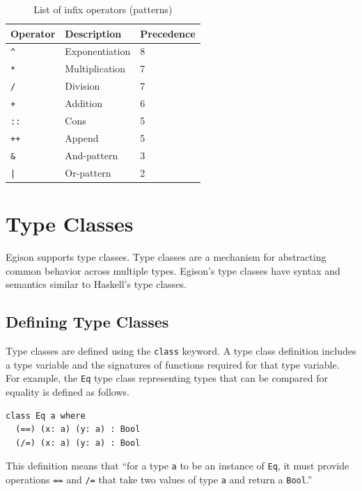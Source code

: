 \begin{table}[h]
\begin{center}
    \begin{tabular}{ | l | l | l |}
    \hline
    Operator & Description & Precedence \\ \hline
    \texttt{\^} & Exponentiation & 8 \\ \hline
    \texttt{*} & Multiplication & 7 \\ \hline
    \texttt{/} & Division & 7 \\ \hline
    \texttt{+} & Addition & 6 \\ \hline
    \texttt{::} & Cons & 5 \\ \hline
    \texttt{++} & Append & 5 \\ \hline
    \texttt{\&} & And-pattern & 3 \\ \hline
    \texttt{|} & Or-pattern & 2 \\ \hline
    \end{tabular}
\end{center}
    \caption{List of infix operators (patterns)}
    \label{tab:infixPatterns}
\end{table}

\section{Type Classes}

Egison supports type classes.
Type classes are a mechanism for abstracting common behavior across multiple types.
Egison's type classes have syntax and semantics similar to Haskell's type classes.

\subsection{Defining Type Classes}

Type classes are defined using the \lstinline{class} keyword.
A type class definition includes a type variable and the signatures of functions required for that type variable.
For example, the \lstinline{Eq} type class representing types that can be compared for equality is defined as follows.
\begin{lstlisting}[language=egison,numbers=none]
class Eq a where
  (==) (x: a) (y: a) : Bool
  (/=) (x: a) (y: a) : Bool
\end{lstlisting}
This definition means that ``for a type \lstinline{a} to be an instance of \lstinline{Eq}, it must provide operations \lstinline{==} and \lstinline{/=} that take two values of type \lstinline{a} and return a \lstinline{Bool}.''

